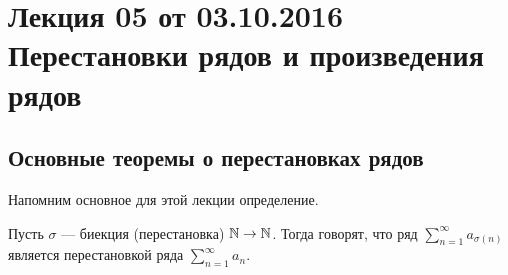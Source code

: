 \documentclass[a4paper, 12pt]{article}
\begin{document}
\pagestyle{fancy}
\section{Лекция 05 от 03.10.2016 \\ Перестановки рядов и произведения рядов}
\subsection{Основные теоремы о перестановках рядов}
Напомним основное для этой лекции определение.
	\begin{Def}
		Пусть $\sigma$ --- биекция (перестановка) $\mathbb{N} \to \mathbb{N}$. Тогда говорят, что ряд $\sum\limits_{n=1}^{\infty}a_{\sigma(n)}$ является перестановкой ряда $\sum\limits_{n=1}^{\infty}a_n$.
	\end{Def}
\end{document}
